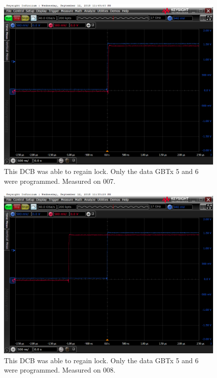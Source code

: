 \documentclass[11pt,letterpaper]{refart}
\begin{document}
\begin{figure}[ht]
    \centering
    \includegraphics[width=0.8\linewidth]
        {./res/voltage_transient/txrdy.png}
    \caption[\texttt{TX\_RDY} signal on regain of lock, almost simutaneously]{
        This DCB was able to regain lock.
        Only the data GBTx 5 and 6 were programmed.
        Measured on 007.
    }
\end{figure}

\begin{figure}[ht]
    \centering
    \includegraphics[width=0.8\linewidth]
        {./res/voltage_transient/txrdy_recoverable.png}
    \caption[\texttt{TX\_RDY} signal on regain of lock, larger temperal
            separation]{
        This DCB was able to regain lock.
        Only the data GBTx 5 and 6 were programmed.
        Measured on 008.
    }
\end{figure}
\end{document}

